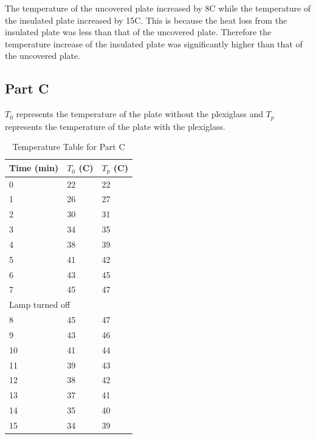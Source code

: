 \documentclass[a4paper, 12pt, english]{article}
\begin{document}
The temperature of the uncovered plate increased by 8\degree C while the
temperature of the insulated plate increased by 15\degree C. This is because
the heat loss from the insulated plate was less than that of the uncovered
plate. Therefore the temperature increase of the insulated plate was
significantly higher than that of the uncovered plate.

\subsection{Part C}
$T_0$ represents the temperature of the plate without the plexiglass and $T_p$
represents the temperature of the plate with the plexiglass.
\begin{table}[H]
	\centering
	\caption{Temperature Table for Part C}
	\label{tab:table3}
	\begin{tabular}{@{}lll@{}}
		\toprule
		\textbf{Time (min)} & \textbf{$T_0$ (\degree C)} & \textbf{$T_p$ (\degree C)} \\ \midrule
		0                   & 22                         & 22                         \\
		1                   & 26                         & 27                         \\
		2                   & 30                         & 31                         \\
		3                   & 34                         & 35                         \\
		4                   & 38                         & 39                         \\
		5                   & 41                         & 42                         \\
		6                   & 43                         & 45                         \\
		7                   & 45                         & 47                         \\
		\bottomrule \multicolumn{3}{l}{Lamp turned off}                               \\ \bottomrule
		8                   & 45                         & 47                         \\
		9                   & 43                         & 46                         \\
		10                  & 41                         & 44                         \\
		11                  & 39                         & 43                         \\
		12                  & 38                         & 42                         \\
		13                  & 37                         & 41                         \\
		14                  & 35                         & 40                         \\
		15                  & 34                         & 39                         \\
		\bottomrule
	\end{tabular}
\end{table}
\end{document}
